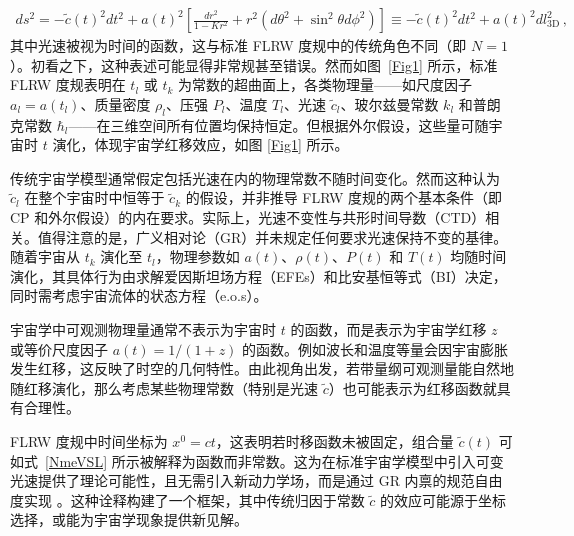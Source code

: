 \documentclass[jkps,preprint,fleqn]{revtex4}
\newcommand{\tc}{\tilde{c}}
\begin{document}
\begin{CJK*}{UTF8}{gbsn}
\begin{align}
ds^2 = - \tc(t)^2 dt^2 + a(t)^2 \left[ \frac{dr^2}{1-Kr^2} + r^2  \left( d \theta^2 + \sin^2 \theta d \phi^2 \right)  \right] \equiv - \tc(t)^2 dt^2 + a(t)^2 dl_{3\textrm{D}}^2 \label{dstgen} \,,
\end{align}
其中光速被视为时间的函数，这与标准 FLRW 度规中的传统角色不同（即 $N = 1$）。初看之下，这种表述可能显得非常规甚至错误。然而如图~\ref{Fig1} 所示，标准 FLRW 度规表明在 $t_l$ 或 $t_k$ 为常数的超曲面上，各类物理量——如尺度因子 $a_l = a(t_l)$、质量密度 $\rho_l$、压强 $P_l$、温度 $T_l$、光速 $\tc_l$、玻尔兹曼常数 $k_l$ 和普朗克常数 $\hbar_l$——在三维空间所有位置均保持恒定。但根据外尔假设，这些量可随宇宙时 $t$ 演化，体现宇宙学红移效应，如图 \ref{Fig1} 所示。

传统宇宙学模型通常假定包括光速在内的物理常数不随时间变化。然而这种认为 $\tc_l$ 在整个宇宙时中恒等于 $\tc_k$ 的假设，并非推导 FLRW 度规的两个基本条件（即 CP 和外尔假设）的内在要求。实际上，光速不变性与共形时间导数（CTD）相关。值得注意的是，广义相对论（GR）并未规定任何要求光速保持不变的基律。随着宇宙从 $t_k$ 演化至 $t_l$，物理参数如 $a(t)$、$\rho(t)$、$P(t)$ 和 $T(t)$ 均随时间演化，其具体行为由求解爱因斯坦场方程（EFEs）和比安基恒等式（BI）决定，同时需考虑宇宙流体的状态方程（e.o.s）。

宇宙学中可观测物理量通常不表示为宇宙时 $t$ 的函数，而是表示为宇宙学红移 $z$ 或等价尺度因子 $a(t) = 1/(1+z)$ 的函数。例如波长和温度等量会因宇宙膨胀发生红移，这反映了时空的几何特性。由此视角出发，若带量纲可观测量能自然地随红移演化，那么考虑某些物理常数（特别是光速 $\tc$）也可能表示为红移函数就具有合理性。

FLRW 度规中时间坐标为 $x^0 = ct$，这表明若时移函数未被固定，组合量 $\tc(t)$ 可如式~\eqref{NmeVSL} 所示被解释为函数而非常数。这为在标准宇宙学模型中引入可变光速提供了理论可能性，且无需引入新动力学场，而是通过 GR 内禀的规范自由度实现 \cite{Lee:2024zcu}。这种诠释构建了一个框架，其中传统归因于常数 $\tc$ 的效应可能源于坐标选择，或能为宇宙学现象提供新见解。


\end{CJK*}
\end{document}
